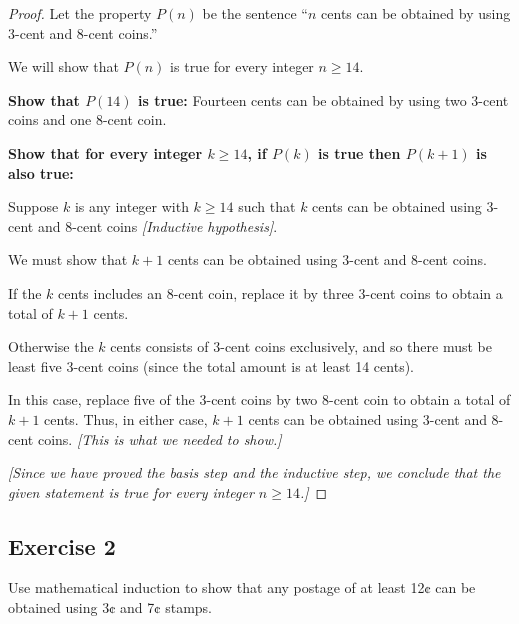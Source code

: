 \documentclass[14pt]{extarticle}
\begin{document}
\begin{proof}
    Let the property $P(n)$ be the sentence “$n$ cents can be obtained by using 3-cent and 8-cent coins.”

    We will show that $P(n)$ is true for every integer $n \geq 14$.

        {\bf Show that $P(14)$ is true:} Fourteen cents can be obtained by using two 3-cent coins and one 8-cent coin.

        {\bf Show that for every integer $k \geq 14$, if $P(k)$ is true then $P(k + 1)$ is also true:}

    Suppose $k$ is any integer with $k \geq 14$ such that $k$ cents can be obtained using 3-cent and 8-cent coins {\it [Inductive hypothesis]}.

    We must show that $k + 1$ cents can be obtained using 3-cent and 8-cent coins.

    If the $k$ cents includes an 8-cent coin, replace it by three 3-cent coins to obtain a total of $k + 1$ cents.

    Otherwise the $k$ cents consists of 3-cent coins exclusively, and so there must be least five 3-cent coins (since the total amount is at least 14 cents).

    In this case, replace five of the 3-cent coins by two 8-cent coin to obtain a total of $k + 1$ cents. Thus, in either case, $k + 1$ cents can be obtained using 3-cent and 8-cent coins. {\it [This is what we needed to show.]}

        {\it [Since we have proved the basis step and the inductive step, we conclude that the given statement is true for every integer $n \geq 14$.]}
\end{proof}

\subsection{Exercise 2}
Use mathematical induction to show that any postage of at least 12¢ can be obtained using 3¢ and 7¢ stamps.
\end{document}
